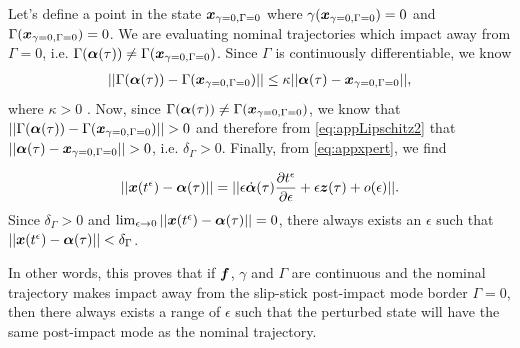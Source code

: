 \documentclass[../DC2019003Bouma.tex]{subfiles}
\begin{document}
Let's define a point in the state ${\boldsymbol{x}}_{\gamma=0,\Gamma=0}$ where $\gamma({\boldsymbol{x}}_{\gamma=0,\Gamma=0})=0$ and $\Gamma({\boldsymbol{x}}_{\gamma=0,\Gamma=0})=0$. We are evaluating nominal trajectories which impact away from $\Gamma = 0$, i.e. $\Gamma(\boldsymbol{\alpha}(\tau))\neq \Gamma({\boldsymbol{x}}_{\gamma=0,\Gamma=0})$. Since $\Gamma$ is continuously differentiable, we know
\begin{align}
||\Gamma(\boldsymbol{\alpha}(\tau)) - \Gamma({\boldsymbol{x}}_{\gamma=0,\Gamma=0})||\leq \kappa||\boldsymbol{\alpha}(\tau)-{\boldsymbol{x}}_{\gamma=0,\Gamma=0}||,\label{eq:appLipschitz2}
\end{align}
where $\kappa>0$ \cite{Leine2008}. Now, since $\Gamma(\boldsymbol{\alpha}(\tau))\neq \Gamma({\boldsymbol{x}}_{\gamma=0,\Gamma=0})$, we know that $||\Gamma(\alphab(\tau)) - \Gamma(\xb_{\gamma=0,\Gamma=0})||>0$ and therefore from \eqref{eq:appLipschitz2} that $||\alphab(\tau)-\xb_{\gamma=0,\Gamma=0}||>0$, i.e. $\delta_{\Gamma} >0$. Finally, from \eqref{eq:appxpert}, we find

\begin{align}
||{\boldsymbol{x}}(t^\epsilon) - \boldsymbol{\alpha}(\tau)|| = ||\epsilon\dot{\boldsymbol{\alpha}}(\tau)\frac{\partial t^\epsilon}{\partial \epsilon} + \epsilon{\boldsymbol{z}}(\tau) + o(\epsilon)||.
\end{align}
Since $\delta_{\Gamma} > 0$ and $\lim_{\epsilon\rightarrow 0}||{\boldsymbol{x}}(t^\epsilon) - \boldsymbol{\alpha}(\tau)||=0$, there always exists an $\epsilon$ such that $||{\boldsymbol{x}}(t^\epsilon) - \boldsymbol{\alpha}(\tau)||<\delta_{\Gamma}$. 

In other words, this proves that if ${\boldsymbol{f}}$, $\gamma$ and $\Gamma$ are continuous and the nominal trajectory makes impact away from the slip-stick post-impact mode border $\Gamma = 0$, then there always exists a range of $\epsilon$ such that the perturbed state will have the same post-impact mode as the nominal trajectory.
\end{document}
